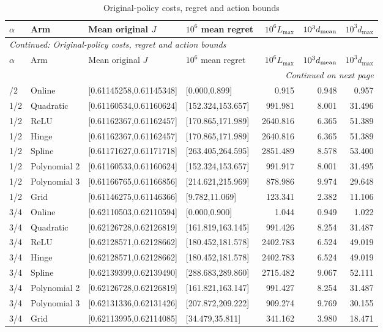 \begingroup\footnotesize\setlength{\tabcolsep}{3pt}
\begin{longtable}{llllrrr}
\caption{Original-policy costs, regret and action bounds}\label{tab:economics119b}\\
\toprule
$\alpha$ & Arm & Mean original $J$ & $10^6$ mean regret & $10^6 L_{\max}$ & $10^3d_{\rm mean}$ & $10^3d_{\max}$\\\midrule
\endfirsthead
\multicolumn{7}{l}{\textit{Continued: Original-policy costs, regret and action bounds}}\\
\toprule
$\alpha$ & Arm & Mean original $J$ & $10^6$ mean regret & $10^6 L_{\max}$ & $10^3d_{\rm mean}$ & $10^3d_{\max}$\\\midrule
\endhead
\midrule\multicolumn{7}{r}{\textit{Continued on next page}}\\
\endfoot
\bottomrule
\endlastfoot
1/2 & Online & [0.61145258,0.61145348] & [0.000,0.899] & 0.915 & 0.948 & 0.957 \\
1/2 & Quadratic & [0.61160534,0.61160624] & [152.324,153.657] & 991.981 & 8.001 & 31.496 \\
1/2 & ReLU & [0.61162367,0.61162457] & [170.865,171.989] & 2640.816 & 6.365 & 51.389 \\
1/2 & Hinge & [0.61162367,0.61162457] & [170.865,171.989] & 2640.816 & 6.365 & 51.389 \\
1/2 & Spline & [0.61171627,0.61171718] & [263.405,264.595] & 2851.489 & 8.578 & 53.400 \\
1/2 & Polynomial 2 & [0.61160533,0.61160624] & [152.324,153.657] & 991.917 & 8.001 & 31.495 \\
1/2 & Polynomial 3 & [0.61166765,0.61166856] & [214.621,215.969] & 878.986 & 9.974 & 29.648 \\
1/2 & Grid & [0.61146275,0.61146366] & [9.782,11.069] & 123.341 & 2.382 & 11.106 \\
3/4 & Online & [0.62110503,0.62110594] & [0.000,0.900] & 1.044 & 0.949 & 1.022 \\
3/4 & Quadratic & [0.62126728,0.62126819] & [161.819,163.145] & 991.426 & 8.254 & 31.487 \\
3/4 & ReLU & [0.62128571,0.62128662] & [180.452,181.578] & 2402.783 & 6.524 & 49.019 \\
3/4 & Hinge & [0.62128571,0.62128662] & [180.452,181.578] & 2402.783 & 6.524 & 49.019 \\
3/4 & Spline & [0.62139399,0.62139490] & [288.683,289.860] & 2715.482 & 9.067 & 52.111 \\
3/4 & Polynomial 2 & [0.62126728,0.62126819] & [161.821,163.147] & 991.427 & 8.254 & 31.487 \\
3/4 & Polynomial 3 & [0.62131336,0.62131426] & [207.872,209.222] & 909.274 & 9.769 & 30.155 \\
3/4 & Grid & [0.62113995,0.62114085] & [34.479,35.811] & 341.162 & 3.980 & 18.471 \\
\end{longtable}
